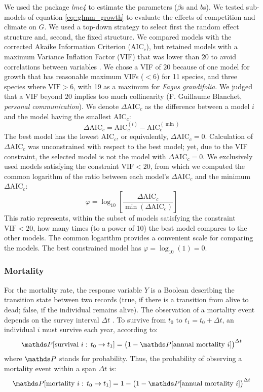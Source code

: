 We used the package \textit{lme4} \citep{lme4} to estimate the parameters ($ \beta $s and $ b $s). We tested sub-models of equation \eqref{eq::glmm_growth} to evaluate the effects of competition and climate on $ G $. We used a top-down strategy to select first the random effect structure and, second, the fixed structure. We compared models with the corrected Akaike Information Criterion ($ \text{AIC}_c $), but retained models with a maximum Variance Inflation Factor (VIF) that was lower than $ 20 $ to avoid correlations between variables \citep{Zuur2010}. We chose a VIF of $ 20 $ because of one model for growth that has reasonable maximum VIFs ($ < 6 $) for 11 species, and three species where $ \text{VIF} > 6 $, with 19 as a maximum for \textit{Fagus grandifolia}. We judged that a VIF beyond $ 20 $ implies too much collinearity (F. Guillaume Blanchet, \textit{personal communication}). We denote $ \Delta \text{AIC}_c $ as the difference between a model $ i $ and the model having the smallest $ \text{AIC}_c $:
\[
	\Delta \text{AIC}_c = \text{AIC}_c^{(i)} - \text{AIC}_c^{(\min)}
\]
The best model has the lowest $ \text{AIC}_c $, or equivalently, $ \Delta \text{AIC}_c = 0 $. Calculation of $ \Delta \text{AIC}_c $ was unconstrained with respect to the best model; yet, due to the VIF constraint, the selected model is not the model with $ \Delta \text{AIC}_c = 0 $. We exclusively used models satisfying the constraint $ \text{VIF} < 20 $, from which we computed the common logarithm of the ratio between each model's $ \Delta \text{AIC}_c $ and the minimum $ \Delta \text{AIC}_c $:
\begin{equation} \label{eq::ratio}
	\varphi = \log_{10}\left[ \frac{\Delta \text{AIC}_c}{\min \left( \Delta \text{AIC}_c \right)} \right]
\end{equation}
This ratio represents, within the subset of models satisfying the constraint $ \text{VIF} < 20 $, how many times (to a power of 10) the best model compares to the other models. The common logarithm provides a convenient scale for comparing the models. The best constrained model has $ \varphi = \log_{10}(1) = 0 $.

\subsubsection{Mortality}
For the mortality rate, the response variable $ Y $ is a Boolean describing the transition state between two records (true, if there is a transition from alive to dead; false, if the individual remains alive). The observation of a mortality event depends on the survey interval $ \Delta t $ \citep{Lines2010}. To survive from $ t_0 $ to $ t_1 = t_0 + \Delta t $, an individual $ i $ must survive each year, according to:
\[
	\Prob[\text{survival } i: \, t_0 \to t_1] = \big(1 - \Prob[\text{annual mortality } i]\big)^{\Delta t}
\]
where $ \Prob $ stands for probability. Thus, the probability of observing a mortality event within a span $ \Delta t $ is:
\[
	\Prob[\text{mortality } i: \, t_0 \to t_1] = 1 - \big(1 - \Prob[\text{annual mortality } i]\big)^{\Delta t}
\]

